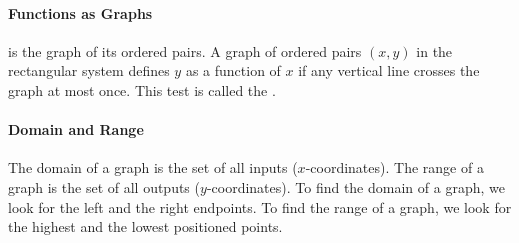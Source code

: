 \paragraph*{Functions as Graphs}
 is the graph of its ordered pairs. 
A graph of ordered pairs $(x,y)$ in the rectangular system defines $y$ as a function of $x$ if any vertical line crosses the graph at most once. This test is called the .

\paragraph*{Domain and Range} 
The domain of a graph is the set of all inputs ($x$-coordinates). The range of a graph is the set of all outputs ($y$-coordinates). 
To find the domain of a graph, we look for the left and the right endpoints. To find the range of a graph, we look for the highest and the lowest positioned points.


